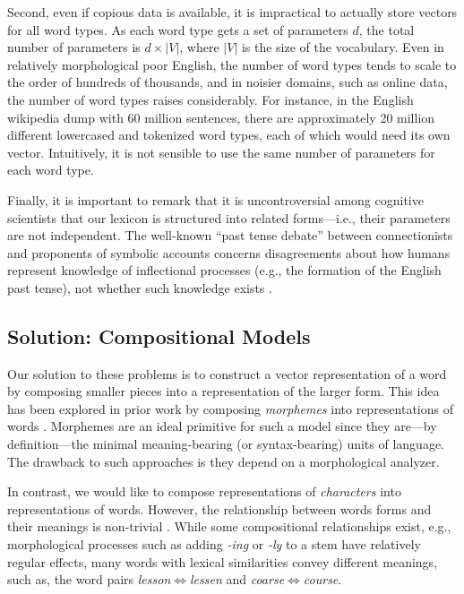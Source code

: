 \documentclass[11pt]{article}
\newcommand{\examp}[1]{\emph{#1}}
\begin{document}
\begin{CJK*}{UTF8}{gbsn}
Second, even if copious data is available, it is impractical to actually store vectors for all word types. As each word type gets a set of parameters $d$, the total number of parameters is $d\times |V|$, where $|V|$ is the size of the vocabulary. Even in relatively morphological poor English, the number of word types tends to scale to the order of hundreds of thousands, and in noisier domains, such as online data, the number of word types raises considerably. For instance, in the English wikipedia dump with 60 million sentences, there are approximately 20 million different lowercased and tokenized word types, each of which would need its own vector. Intuitively, it is not sensible to use the same number of parameters for each word type.

Finally, it is important to remark that it is uncontroversial among cognitive scientists that our lexicon is structured into related forms---i.e., their parameters are not independent. The well-known ``past tense debate'' between connectionists and proponents of symbolic accounts concerns disagreements about how humans represent knowledge of inflectional processes (e.g., the formation of the English past tense), not whether such knowledge exists \cite{mw:1998}.



\subsection{Solution: Compositional Models}
Our solution to these problems is to construct a vector representation of a word by composing smaller pieces into a representation of the larger form. This idea has been explored in prior work by composing \emph{morphemes} into representations of words \cite{W13-3512,Botha2014,soricut:2015}. Morphemes are an ideal primitive for such a model since they are---by definition---the minimal meaning-bearing (or syntax-bearing) units of language. The drawback to such approaches is they depend on a morphological analyzer.

In contrast, we would like to compose representations of \emph{characters} into representations of words. However, the relationship between words forms and their meanings is non-trivial \cite{saussure:2013}. While some compositional relationships exist, e.g., morphological processes such as adding \emph{-ing} or \emph{-ly} to a stem have relatively regular effects, many words with lexical similarities convey different meanings, such as, the word pairs \examp{lesson}$\iff$\examp{lessen} and \examp{coarse}$\iff$\examp{course}.


\end{CJK*}
\end{document}
